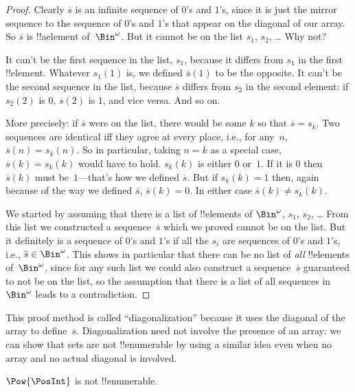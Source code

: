 \begin{proof}
Clearly $\overline{s}$ is an infinite sequence of $0$'s and
$1$'s, since it is just the mirror sequence to the sequence of $0$'s
and $1$'s that appear on the diagonal of our array.  So $\overline{s}$
is !!a{element} of~$\Bin^\omega$.  But it cannot be on the list $s_1$,
$s_2$, \dots{} Why not?

It can't be the first sequence in the list, $s_1$, because it differs from
$s_1$ in the first !!{element}.  Whatever $s_1(1)$ is, we defined
$\overline{s}(1)$ to be the opposite.  It can't be the second
sequence in the list, because $\overline{s}$ differs from $s_2$ in the second
element: if $s_2(2)$ is $0$, $\overline{s}(2)$ is $1$, and vice
versa. And so on.

More precisely: if $\overline{s}$ were on the list, there would be
some $k$ so that $\overline{s} = s_{k}$.  Two sequences are identical
iff they agree at every place, i.e., for any~$n$, $\overline{s}(n) =
s_{k}(n)$.  So in particular, taking $n = k$ as a special case,
$\overline{s}(k) = s_{k}(k)$ would have to hold. $s_k(k)$ is either
$0$ or~$1$. If it is $0$ then $\overline{s}(k)$ must be~$1$---that's
how we defined $\overline{s}$. But if $s_k(k) = 1$ then, again because
of the way we defined $\overline{s}$, $\overline{s}(k) = 0$. In either
case $\overline{s}(k) \neq s_{k}(k)$.

We started by assuming that there is a list of !!{element}s of
$\Bin^\omega$, $s_1$, $s_2$, \dots{} From this list we constructed a
sequence~$\overline{s}$ which we proved cannot be on the list.  But it
definitely is a sequence of $0$'s and $1$'s if all the $s_i$ are
sequences of $0$'s and $1$'s, i.e., $\overline{s} \in
\Bin^\omega$. This shows in particular that there can be no list of
\emph{all} !!{element}s of~$\Bin^\omega$, since for any such list we
could also construct a sequence~$\overline{s}$ guaranteed to not be on
the list, so the assumption that there is a list of all sequences
in~$\Bin^\omega$ leads to a contradiction.
\end{proof}

\begin{explain}
This proof method is called ``diagonalization'' because it uses the
diagonal of the array to define~$\overline{s}$. Diagonalization need
not involve the presence of an array: we can show that sets are not
!!{enumerable} by using a similar idea even when no array and no
actual diagonal is involved.
\end{explain}

\begin{thm}
$\Pow{\PosInt}$ is not !!{enumerable}.
\end{thm}

